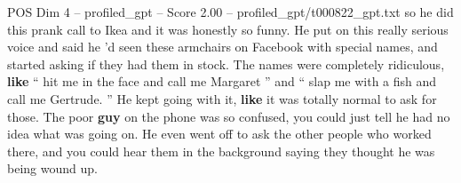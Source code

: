 \begin{textsample}{POS Dim 4 – profiled\_gpt – Score 2.00 – profiled\_gpt/t000822\_gpt.txt}  \label{ex:f4_pos_036}
so he did this prank call to Ikea and it was honestly so funny.
He put on this really serious voice and said he ’d seen these armchairs on Facebook with special names, and started asking if they had them in stock.
The names were completely ridiculous, \textbf{like} “ hit me in the face and call me Margaret ” and “ slap me with a fish and call me Gertrude. ” He kept going with it, \textbf{like} it was totally normal to ask for those.
The poor \textbf{guy} on the phone was so confused, you could just tell he had no idea what was going on.
He even went off to ask the other people who worked there, and you could hear them in the background saying they thought he was being wound up.

\end{textsample}
